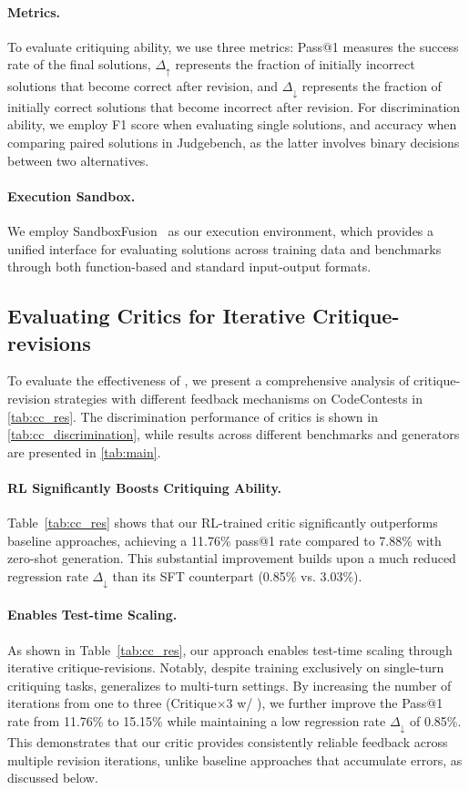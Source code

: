 \paragraph{Metrics.}
To evaluate critiquing ability, we use three metrics: Pass@1 measures the success rate of the final solutions, $\Delta_\uparrow$ represents the fraction of initially incorrect solutions that become correct after revision, and $\Delta_\downarrow$ represents the fraction of initially correct solutions that become incorrect after revision. For discrimination ability, we employ F1 score when evaluating single solutions, and accuracy when comparing paired solutions in Judgebench, as the latter involves binary decisions between two alternatives.


\paragraph{Execution Sandbox.} We employ SandboxFusion~\cite{liu2024fullstack} as our execution environment, which provides a unified interface for evaluating solutions across training data and benchmarks through both function-based and standard input-output formats.



\subsection{Evaluating Critics for Iterative Critique-revisions}\label{sec:exp_critique_revision}
To evaluate the effectiveness of {\ours}, we present a comprehensive analysis of critique-revision strategies with different feedback mechanisms on CodeContests in \cref{tab:cc_res}.
The discrimination performance of critics is shown in \cref{tab:cc_discrimination}, while results across different benchmarks and generators are presented in \cref{tab:main}.

\paragraph{RL Significantly Boosts Critiquing Ability.}
Table~\ref{tab:cc_res} shows that our RL-trained critic significantly outperforms baseline approaches, achieving a 11.76\% pass@1 rate compared to 7.88\% with zero-shot generation. This substantial improvement builds upon a much reduced regression rate $\Delta_\downarrow$ than its SFT counterpart (0.85\% vs. 3.03\%).

\paragraph{{\ours} Enables Test-time Scaling.}
As shown in Table~\ref{tab:cc_res}, our approach enables test-time scaling through iterative critique-revisions. Notably, despite training exclusively on single-turn critiquing tasks, {\ours} generalizes to multi-turn settings. By increasing the number of iterations from one to three (Critique$\times3$ w/ {\ours}), we further improve the Pass@1 rate from 11.76\% to 15.15\% while maintaining a low regression rate $\Delta_\downarrow$ of 0.85\%. This demonstrates that our critic provides consistently reliable feedback across multiple revision iterations, unlike baseline approaches that accumulate errors, as discussed below.

